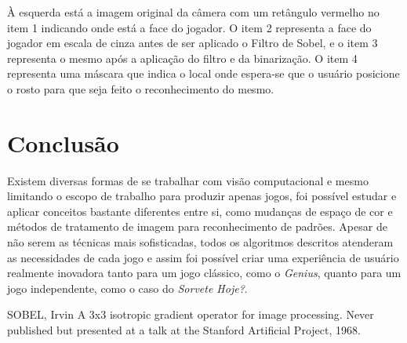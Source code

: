 \documentclass{sciposter}
\begin{document}
\begin{multicols}{3}
À esquerda está a imagem original da câmera com um retângulo vermelho no item 1 indicando onde está a face do jogador.
O item 2 representa a face do jogador em escala de cinza antes de ser aplicado o Filtro de Sobel, e o item 3 representa o mesmo após a aplicação do filtro e da binarização.
O item 4 representa uma máscara que indica o local onde espera-se que o usuário posicione o rosto para que seja feito o reconhecimento do mesmo.

\section{Conclusão}

Existem diversas formas de se trabalhar com visão computacional e mesmo limitando o escopo de trabalho para produzir apenas jogos, foi possível estudar e aplicar conceitos bastante diferentes entre si, como mudanças de espaço de cor e métodos de tratamento de imagem para reconhecimento de padrões. Apesar de não serem as técnicas mais sofisticadas, todos os algoritmos descritos atenderam as necessidades de cada jogo e assim foi possível criar uma experiência de usuário realmente inovadora tanto para um jogo clássico, como o \textit{Genius}, quanto para um jogo independente, como o caso do \textit{Sorvete Hoje?}. 



\begin{thebibliography}{1}


  
{SOBEL, Irvin}
\newblock A 3x3 isotropic gradient operator for image processing.
\newblock Never published but presented at a talk at the Stanford Artificial
  Project, 1968.
\end{thebibliography}

\end{multicols}
\end{document}
